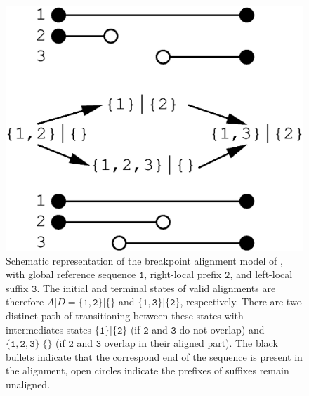 \documentclass[a4paper,10pt]{article}
\let\cite\citep
\begin{document}
\begin{figure}
  \begin{center}
    \includegraphics[width=0.9\columnwidth]{Fig1.eps}
  \end{center}
  \caption{Schematic representation of the breakpoint alignment model of
    \cite{AlArab:17a}, with global reference sequence $\mathtt{1}$,
    right-local prefix $\mathtt{2}$, and left-local suffix $\mathtt{3}$.
    The initial and terminal states of valid alignments are therefore
    $A|D=\{\mathtt{1},\mathtt{2}\}|\{\}$ and
    $\{\mathtt{1},\mathtt{3}\}|\{\mathtt{2}\}$, respectively.  There are
    two distinct path of transitioning between these states with
    intermediates states $\{\mathtt{1}\}|\{\mathtt{2}\}$ (if $\mathtt{2}$
    and $\mathtt{3}$ do not overlap) and $\{\mathtt{1,2,3}\}|\{\}$ (if
    $\mathtt{2}$ and $\mathtt{3}$ overlap in their aligned part). The black
    bullets indicate that the correspond end of the sequence is present in
    the alignment, open circles indicate the prefixes of suffixes remain
    unaligned.}
  \label{fig:Marwa}
\end{figure}
\end{document}
